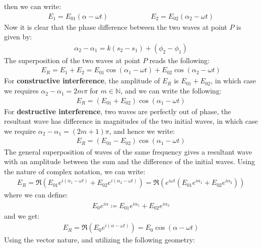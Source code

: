 \documentclass[11pt]{book}
\theoremstyle{break}
\theoremstyle{break}
\newcommand{\N}{\mathbb{N}}
\begin{document}
then we can write:
\begin{align*}
E_1 = E_{01}(\alpha - \omega t) \qquad\qquad\qquad E_2 = E_{02}(\alpha_2 -\omega t)
\end{align*}
Now it is clear that the phase difference between the two waves at point $P$ is given by:
\begin{align*}
\alpha_2 - \alpha_1 = k(s_2 - s_1) + (\phi_2 - \phi_1)
\end{align*}
The superposition of the two waves at point $P$ reads the following:
\begin{align*}
E_R = E_1 + E_2 = E_{01}\cos(\alpha_1 - \omega t) + E_{02} \cos(\alpha_2 - \omega t)
\end{align*}
For \textbf{constructive interference}, the amplitude of $E_R$ is $E_{01}+E_{02}$, in which case we requires $\alpha_2 - \alpha_1 = 2m\pi$ for $m \in \N$, and we can write the following:
\begin{align*}
E_{R} = (E_{01}+E_{02})\cos(\alpha_1 -\omega t)
\end{align*}
For \textbf{destructive interference}, two waves are perfectly out of phase, the resultant wave has difference in magnitudes of the two initial waves, in which case we require $\alpha_2 - \alpha_1 = (2m+1) \pi$, and hence we write:
\begin{align*}
E_R = (E_{01} -E_{02})\cos(\alpha_1 -\omega t)
\end{align*}
The general superposition of waves of the same frequency gives a resultant wave with an amplitude between the sum and the difference of the initial waves. Using the nature of complex notation, we can write:
\begin{align*}
E_R = \Re\left( E_{01}e^{i(\alpha_1 -\omega t)} + E_{02}e^{i(\alpha_2 -\omega t)}\right) = \Re\left( e^{i \omega t}\left( E_{01}e^{i\alpha_1}+E_{02}e^{i\alpha_2}\right)\right)
\end{align*}
where we can define:
\begin{align*}
E_0 e^{i\alpha} \coloneqq E_{01}e^{i\alpha_1} + E_{02}e^{i\alpha_2}
\end{align*}
and we get:
\begin{align*}
E_R = \Re\left( E_0 e^{i(\alpha -\omega t)}\right) = E_0 \cos(\alpha -\omega t)
\end{align*}
Using the vector nature, and utilizing the following geometry:
\end{document}
